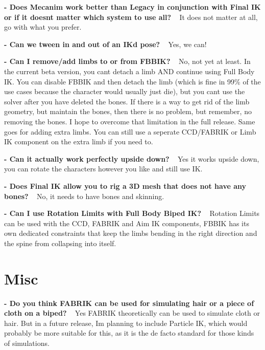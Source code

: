 {\bfseries -\/ Does Mecanim work better than Legacy in conjunction with Final IK or if it doesn\textquotesingle{}t matter which system to use all?} ~\newline
It does not matter at all, go with what you prefer.

{\bfseries -\/ Can we tween in and out of an IK\textquotesingle{}d pose? } ~\newline
Yes, we can!

{\bfseries -\/ Can I remove/add limbs to or from F\+B\+B\+IK?} ~\newline
No, not yet at least. In the current beta version, you can\textquotesingle{}t detach a limb A\+ND continue using Full Body IK. You can disable F\+B\+B\+IK and then detach the limb (which is fine in 99\% of the use cases because the character would usually just die), but you can\textquotesingle{}t use the solver after you have deleted the bones. If there is a way to get rid of the limb geometry, but maintain the bones, then there is no problem, but remember, no removing the bones. I hope to overcome that limitation in the full release. Same goes for adding extra limbs. You can still use a seperate C\+C\+D/\+F\+A\+B\+R\+IK or Limb IK component on the extra limb if you need to.

{\bfseries -\/ Can it actually work perfectly upside down?} ~\newline
Yes it works upside down, you can rotate the characters however you like and still use IK.

{\bfseries -\/ Does Final IK allow you to rig a 3D mesh that does not have any bones?} ~\newline
No, it needs to have bones and skinning.

{\bfseries -\/ Can I use Rotation Limits with Full Body Biped IK?} ~\newline
Rotation Limits can be used with the C\+CD, F\+A\+B\+R\+IK and Aim IK components, F\+B\+B\+IK has it\textquotesingle{}s own dedicated constraints that keep the limbs bending in the right direction and the spine from collapsing into itself.\hypertarget{page14_Misc}{}\section{Misc}\label{page14_Misc}
{\bfseries -\/ Do you think F\+A\+B\+R\+IK can be used for simulating hair or a piece of cloth on a biped?} ~\newline
Yes F\+A\+B\+R\+IK theoretically can be used to simulate cloth or hair. But in a future release, I\textquotesingle{}m planning to include Particle IK, which would probably be more suitable for this, as it is the de facto standard for those kinds of simulations.


